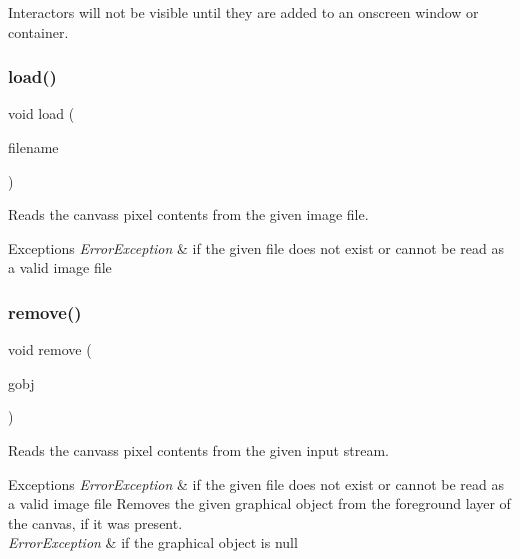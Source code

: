 Interactors will not be visible until they are added to an onscreen window or container. \mbox{\label{classsgl_1_1GCanvas_a6c21edd9d285c925527e3209fca54b01}} 
\subsubsection{\texorpdfstring{load()}{load()}}
{\footnotesize\ttfamily void load (\begin{DoxyParamCaption}\item[{const std\+::string \&}]{filename }\end{DoxyParamCaption})\hspace{0.3cm}{\ttfamily [virtual]}}



Reads the canvas\textquotesingle{}s pixel contents from the given image file. 


\begin{DoxyExceptions}{Exceptions}
{\em Error\+Exception} & if the given file does not exist or cannot be read as a valid image file \\
\hline
\end{DoxyExceptions}
\mbox{\label{classsgl_1_1GCanvas_a49dc57a2ce4caa354a5fff6acdde2e7d}} 
\subsubsection{\texorpdfstring{remove()}{remove()}\hspace{0.1cm}{\footnotesize\ttfamily [1/2]}}
{\footnotesize\ttfamily void remove (\begin{DoxyParamCaption}\item[{\mbox{\hyperlink{classsgl_1_1GObject}{G\+Object}} $\ast$}]{gobj }\end{DoxyParamCaption})\hspace{0.3cm}{\ttfamily [virtual]}}



Reads the canvas\textquotesingle{}s pixel contents from the given input stream. 


\begin{DoxyExceptions}{Exceptions}
{\em Error\+Exception} & if the given file does not exist or cannot be read as a valid image file Removes the given graphical object from the foreground layer of the canvas, if it was present. \\
\hline
{\em Error\+Exception} & if the graphical object is null \\
\hline
\end{DoxyExceptions}
\mbox{\label{classsgl_1_1GCanvas_a0c0ae4d69b584602ff3cba0d9cf330a4}} 
